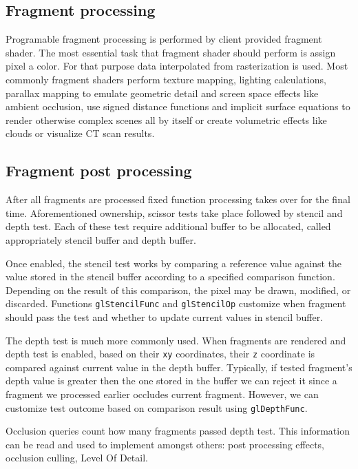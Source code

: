 \subsection{Fragment processing}

Programable fragment processing is performed by client provided fragment shader. The most essential task that fragment shader should perform is assign pixel a color.
For that purpose data interpolated from rasterization is used. 
Most commonly fragment shaders perform texture mapping, lighting calculations, parallax mapping to emulate geometric detail and screen space effects like ambient occlusion, 
use signed distance functions and implicit surface equations to render otherwise complex scenes all by itself or create volumetric effects like clouds or visualize CT scan results.

\subsection{Fragment post processing}

After all fragments are processed fixed function processing takes over for the final time.
Aforementioned ownership, scissor tests take place followed by stencil and depth test.
Each of these test require additional buffer to be allocated, called appropriately stencil buffer and depth buffer.

Once enabled, the stencil test works by comparing a reference value against the value stored in the stencil buffer according to a specified comparison function. 
Depending on the result of this comparison, the pixel may be drawn, modified, or discarded. 
Functions \texttt{glStencilFunc} and \texttt{glStencilOp} customize when fragment should pass the test and whether to update current values in stencil buffer.

The depth test is much more commonly used. 
When fragments are rendered and depth test is enabled, based on their \texttt{xy} coordinates, their \texttt{z} coordinate is compared against current value in the depth buffer.
Typically, if tested fragment's depth value is greater then the one stored in the buffer we can reject it since a fragment we processed earlier occludes current fragment.
However, we can customize test outcome based on comparison result using \texttt{glDepthFunc}.

Occlusion queries count how many fragments passed depth test. This information can be read and used to implement amongst others: post processing effects, occlusion culling, Level Of Detail.

